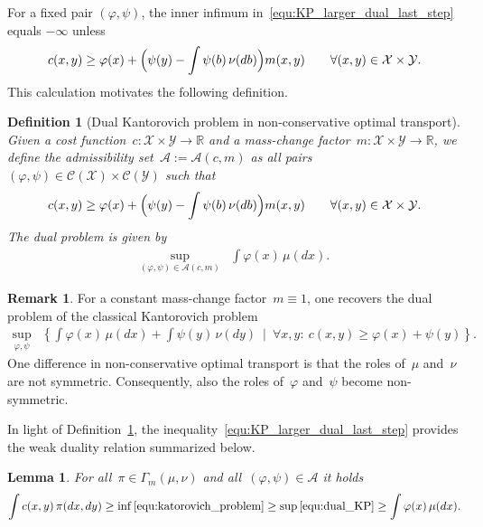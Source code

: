 \documentclass{article}
\newtheorem{definition}[theorem]{Definition}
\newtheorem{lemma}[theorem]{Lemma}
\theoremstyle{definition}
\newtheorem{remark}[theorem]{Remark}
\def\cC{\mathcal{C}}
\begin{document}
For a fixed pair $(\varphi, \psi)$, the inner infimum in~\eqref{equ:KP_larger_dual_last_step} equals $-\infty$ unless
\[
c(x,y)\ge \varphi(x)+\Bigl(\psi(y)-\int \psi (b)\,\nu(db)\Bigr)m(x,y) \qquad \forall (x,y)\in \mathcal{X} \times \mathcal{Y}.
\]
This calculation motivates the following definition.

\begin{definition}[Dual Kantorovich problem in non-conservative optimal transport] \label{def:dual_problem}
    Given a cost function~$c: \mathcal{X} \times \mathcal{Y} \to \mathbb{R}$ and a mass-change factor~$m: \mathcal{X} \times \mathcal{Y} \to \mathbb{R}$, we define the admissibility set~$ \mathcal{A} := \mathcal{A}(c,m)$ as all pairs~$(\varphi, \psi) \in \cC (\mathcal{X}) \times \cC(\mathcal{Y})$ such that
    \begin{align}\label{equ:DP_admissability_set}
      c(x,y) \geq \varphi(x)+\Bigl(\psi(y)-\int \psi (b)\,\nu(db)\Bigr)m(x,y) \qquad \forall (x,y) \in \mathcal{X} \times \mathcal{Y}.
    \end{align}
 The dual problem is given by
\begin{align}
  \sup_{(\varphi, \psi) \in \mathcal{A}(c,m)}&
 \int \varphi(x)\,\mu(dx) . \tag{DP} \label{equ:dual_KP} 
\end{align}


\end{definition}
\begin{remark}
    For a constant mass-change factor~$m\equiv1$, one recovers the dual problem of the classical Kantorovich problem 
\begin{align}
         \sup\limits_{\varphi, \psi}&
\left\{ \int \varphi(x)\,\mu(dx) + \int \psi(y)\, \nu(dy) \ \mid  \ \forall x,y: \ c(x,y) \geq \varphi(x) + \psi(y)  \right\}.
\end{align} 
    One difference in non-conservative optimal transport is that the roles of~$\mu$ and~$\nu$ are not symmetric. Consequently, also the roles of~$\varphi$ and~$\psi$ become non-symmetric.
\end{remark}



In light of Definition~\ref{def:dual_problem}, the inequality~\eqref{equ:KP_larger_dual_last_step} provides the weak duality relation summarized below.

\begin{lemma}
For all~$\pi\in\Gamma_{m}(\mu,\nu)$ and all~$(\varphi , \psi ) \in \mathcal{A}$ it holds
\begin{align*}
      \int c(x,y)\,\pi(dx,dy) \geq \inf \eqref{equ:katorovich_problem} \geq  \sup \eqref{equ:dual_KP}  \geq  \int \varphi(x)\,\mu(dx).   
\end{align*}
\end{lemma}
\end{document}
